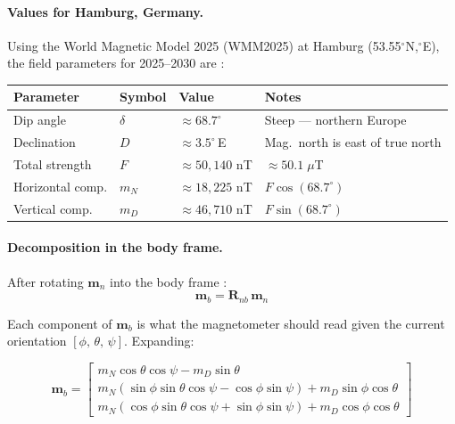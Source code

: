 \documentclass[12pt,a4paper]{article}
\begin{document}
\paragraph{Values for Hamburg, Germany.}

Using the World Magnetic Model 2025 (WMM2025) at Hamburg
(53.55$^{\circ}$N,$^{\circ}$E), the field parameters for
2025--2030 are \citep{chulliat2024wmm2025}:

\begin{center}
\begin{tabular}{llll}
\toprule
\textbf{Parameter} & \textbf{Symbol} & \textbf{Value} & \textbf{Notes} \\
\midrule
Dip angle         & $\delta$ & $\approx 68.7^{\circ}$ & Steep --- northern Europe \\
Declination       & $D$      & $\approx 3.5^{\circ}$\,E & Mag.\ north is east of true north \\
Total strength    & $F$      & $\approx 50{,}140$ nT     & $\approx 50.1\;\mu$T \\
Horizontal comp.  & $m_N$    & $\approx 18{,}225$ nT     & $F\cos(68.7^{\circ})$ \\
Vertical comp.    & $m_D$    & $\approx 46{,}710$ nT     & $F\sin(68.7^{\circ})$ \\
\bottomrule
\end{tabular}
\end{center}

\paragraph{Decomposition in the body frame.}

After rotating $\bm{m}_n$ into the body frame \citep{groves2013principles}:
\begin{equation}
  \bm{m}_b = \bm{R}_{nb}\,\bm{m}_n
  \label{eq:mag_body}
\end{equation}

Each component of $\bm{m}_b$ is what the magnetometer should read given the
current orientation $[\phi,\,\theta,\,\psi]$. Expanding:

\begin{equation}
  \bm{m}_b =
  \begin{bmatrix}
    m_N\cos\theta\cos\psi - m_D\sin\theta \\
    m_N(\sin\phi\sin\theta\cos\psi - \cos\phi\sin\psi) + m_D\sin\phi\cos\theta \\
    m_N(\cos\phi\sin\theta\cos\psi + \sin\phi\sin\psi) + m_D\cos\phi\cos\theta
  \end{bmatrix}
    \label{eq:mag_eq}
\end{equation}
\end{document}

